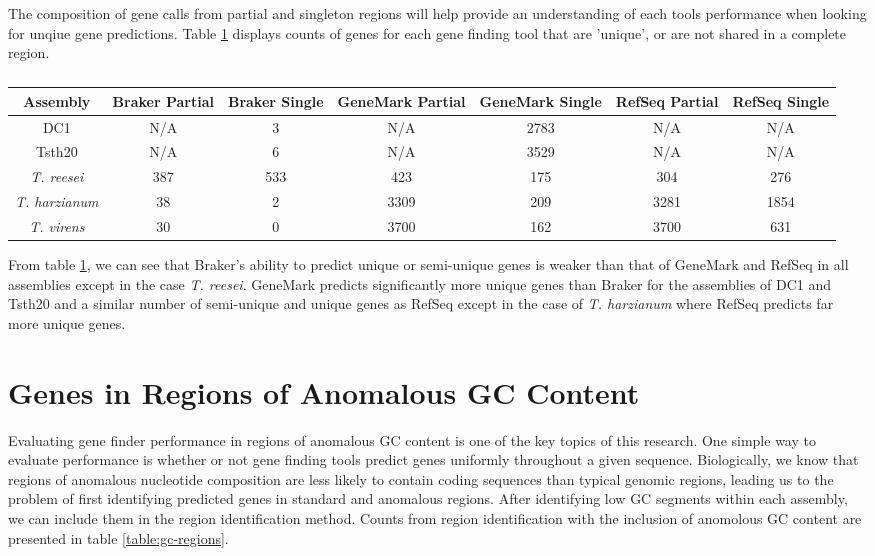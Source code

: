 The composition of gene calls from partial and singleton regions will
help provide an understanding of each tools performance when looking
for unqiue gene predictions. Table \ref{table:uniquegenes} displays
counts of genes for each gene finding tool that are 'unique', or are
not shared in a complete region.

\begin{table}
  \begin{center}
    \begin{tabular}{|c|c|c|c|c|c|c|}
      \hline
      Assembly & Braker Partial & Braker Single & GeneMark Partial & GeneMark Single & RefSeq Partial & RefSeq Single \\ \hline
      DC1 & N/A & 3 & N/A & 2783 & N/A & N/A \\ \hline
      Tsth20 & N/A & 6 & N/A & 3529 & N/A & N/A \\ \hline
      \textit{T. reesei} & 387 & 533 & 423 & 175 & 304 & 276 \\ \hline
      \textit{T. harzianum} & 38 & 2 & 3309 & 209 & 3281 & 1854 \\ \hline
      \textit{T. virens} & 30 & 0 & 3700 & 162 & 3700 & 631 \\ \hline
    \end{tabular}
  \end{center}
  \caption[Counts of `unique' gene predictions]{}
  \label{table:uniquegenes}
\end{table}

From table \ref{table:uniquegenes}, we can see that Braker's ability
to predict unique or semi-unique genes is weaker than that of GeneMark
and RefSeq in all assemblies except in the case
\textit{T. reesei}. GeneMark predicts significantly more unique genes
than Braker for the assemblies of DC1 and Tsth20 and a similar number
of semi-unique and unique genes as RefSeq except in the case of
\textit{T. harzianum} where RefSeq predicts far more unique genes.

\section{Genes in Regions of Anomalous GC Content}

Evaluating gene finder performance in regions of anomalous GC content
is one of the key topics of this research. One simple way to evaluate
performance is whether or not gene finding tools predict genes
uniformly throughout a given sequence. Biologically, we know that
regions of anomalous nucleotide composition are less likely to contain
coding sequences than typical genomic regions, leading us to the
problem of first identifying predicted genes in standard and anomalous
regions. After identifying low GC segments within each assembly, we
can include them in the region identification method. Counts from
region identification with the inclusion of anomolous GC content are
presented in table \ref{table:gc-regions}.

